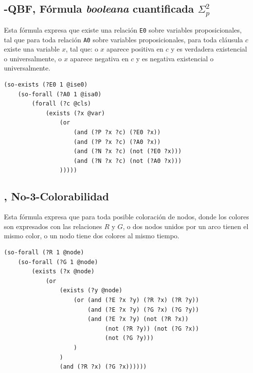 \subsection{\qEA-QBF, Fórmula \textit{booleana} cuantificada $\Sigma_p^2$}
Esta fórmula expresa que existe una relación \texttt{E0} sobre variables
proposicionales, tal que para toda relación \texttt{A0} sobre variables
proposicionales, para toda cláusula $c$ existe una variable $x$, tal que: o $x$ aparece
positiva en $c$ y es verdadera existencial o universalmente, o $x$ aparece negativa en $c$ y
es negativa existencial o universalmente.
\begin{verbatim}
(so-exists (?E0 1 @ise0)
    (so-forall (?A0 1 @isa0)
        (forall (?c @cls)
            (exists (?x @var)
                (or
                    (and (?P ?x ?c) (?E0 ?x))
                    (and (?P ?x ?c) (?A0 ?x))
                    (and (?N ?x ?c) (not (?E0 ?x)))
                    (and (?N ?x ?c) (not (?A0 ?x)))
                )))))
\end{verbatim}

\subsection{\coCOL, No-3-Colorabilidad}
Esta fórmula expresa que para toda posible coloración de nodos, donde los
colores son expresados con las relaciones $R$ y $G$, o dos nodos unidos por un arco tienen
el mismo color, o un nodo tiene dos colores al mismo tiempo.
\begin{verbatim}
(so-forall (?R 1 @node)
    (so-forall (?G 1 @node)
        (exists (?x @node)
            (or 
                (exists (?y @node)
                    (or (and (?E ?x ?y) (?R ?x) (?R ?y))
                        (and (?E ?x ?y) (?G ?x) (?G ?y))
                        (and (?E ?x ?y) (not (?R ?x)) 
                             (not (?R ?y)) (not (?G ?x)) 
                             (not (?G ?y)))
                    )
                )
                (and (?R ?x) (?G ?x))))))
\end{verbatim}

